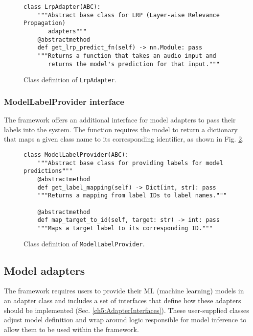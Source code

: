 \documentclass[
    bindingoffset=5mm,  %
    footnoteindent=3mm, %
    hyphenation=true    %
]{src/wut-thesis}
\begin{document}
\begin{figure}%
\begin{verbatim}
class LrpAdapter(ABC):
    """Abstract base class for LRP (Layer-wise Relevance Propagation)
       adapters"""
    @abstractmethod
    def get_lrp_predict_fn(self) -> nn.Module: pass
    """Returns a function that takes an audio input and
       returns the model's prediction for that input."""
\end{verbatim}
\caption{Class definition of \texttt{LrpAdapter}.}
\label{fig:LrpAdapter}
\end{figure}

\subsubsection{ModelLabelProvider interface}

The framework offers an additional interface for model adapters to pass their labels into the system.
The function requires the model to return a dictionary that maps a given class
name to its corresponding identifier, as shown in Fig. \ref{fig:ModelLabelProvider}.

\begin{figure}%
\begin{verbatim}
class ModelLabelProvider(ABC):
    """Abstract base class for providing labels for model predictions"""
    @abstractmethod
    def get_label_mapping(self) -> Dict[int, str]: pass
    """Returns a mapping from label IDs to label names."""

    @abstractmethod
    def map_target_to_id(self, target: str) -> int: pass
    """Maps a target label to its corresponding ID."""
\end{verbatim}
\caption{Class definition of \texttt{ModelLabelProvider}.}
\label{fig:ModelLabelProvider}
\end{figure}

\subsection{Model adapters} \label{ch5:ModelAdapters}

The framework requires users to provide their ML (machine learning) models
in an adapter class and includes a set of interfaces that define how these
adapters should be implemented (Sec. \ref{ch5:AdapterInterfaces}). These user-supplied classes adjust
model definition and wrap around logic responsible for model inference to allow
them to be used within the framework.
\end{document}
